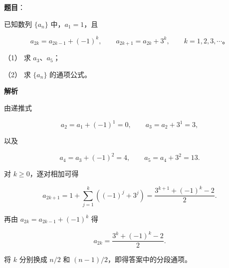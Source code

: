 \begin{answer}

\textbf{题目}：

已知数列 $\{a_n\}$ 中，$a_1=1$，且

\nopagebreak[4]
\[
a_{2k}=a_{2k-1}+(-1)^k,\qquad a_{2k+1}=a_{2k}+3^k,\qquad k=1,2,3,\cdots\text{。}
\]

（1） 求 $a_3\text{、}a_5$；

（2） 求 $\{a_n\}$ 的通项公式。

\textbf{解析}


由递推式

\nopagebreak[4]
\[
a_2=a_1+(-1)^1=0,\qquad a_3=a_2+3^1=3,
\]

以及

\nopagebreak[4]
\[
a_4=a_3+(-1)^2=4,\qquad a_5=a_4+3^2=13.
\]


对 $k\geqslant0$，逐对相加可得

\nopagebreak[4]
\[
a_{2k+1}=1+\sum_{j=1}^k\left((-1)^j+3^j\right)
=\frac{3^{k+1}+(-1)^k-2}{2}.
\]

再由 $a_{2k}=a_{2k-1}+(-1)^k$ 得

\nopagebreak[4]
\[
a_{2k}=\frac{3^k+(-1)^k-2}{2}.
\]

将 $k$ 分别换成 $n/2$ 和 $(n-1)/2$，即得答案中的分段通项。



\end{answer}